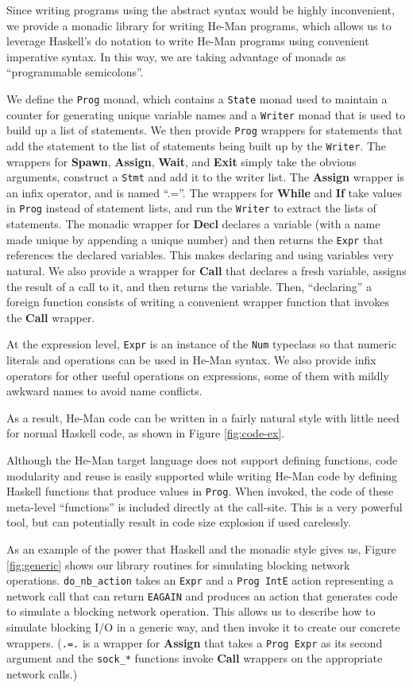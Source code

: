 \documentclass[preprint]{sigplanconf}
\renewcommand{\t}{\texttt}
\renewcommand{\b}{\textbf}
\begin{document}
Since writing programs using the abstract syntax would be highly
inconvenient, we provide a monadic library for writing He-Man
programs, which allows us to leverage Haskell's do notation to write
He-Man programs using convenient imperative syntax. In this way, we
are taking advantage of monads as ``programmable semicolons''.

We define the \t{Prog} monad, which contains a \t{State} monad used to
maintain a counter for generating unique variable names and a
\t{Writer} monad that is used to build up a list of statements. We
then provide \t{Prog} wrappers for statements that add the statement
to the list of statements being built up by the \t{Writer}. The
wrappers for \b{Spawn}, \b{Assign}, \b{Wait}, and \b{Exit} simply take
the obvious arguments, construct a \t{Stmt} and add it to the writer
list. The \b{Assign} wrapper is an infix operator, and is named
``.=''. The wrappers for \b{While} and \b{If} take values in \t{Prog}
instead of statement lists, and run the \t{Writer} to extract the
lists of statements. The monadic wrapper for \b{Decl} declares a
variable (with a name made unique by appending a unique number) and
then returns the \t{Expr} that references the declared variables. This
makes declaring and using variables very natural. We also provide a
wrapper for \b{Call} that declares a fresh variable, assigns the
result of a call to it, and then returns the variable. Then,
``declaring'' a foreign function consists of writing a convenient
wrapper function that invokes the \b{Call} wrapper.

At the expression level, \t{Expr} is an instance of the \t{Num} typeclass 
so that numeric literals and operations can be used in He-Man
syntax. We also provide infix operators for other useful operations on
expressions, some of them with mildly awkward names to avoid name conflicts.

As a result, He-Man code can be written in a fairly natural style with little
need for normal Haskell code, as shown in Figure \ref{fig:code-ex}.

Although the He-Man target language does not support defining
functions, code modularity and reuse is easily supported while writing
He-Man code by defining Haskell functions that produce values in
\t{Prog}. When invoked, the code of these meta-level ``functions'' is
included directly at the call-site. This is a very powerful tool, but
can potentially result in code size explosion if used carelessly.

As an example of the power that Haskell and the monadic style gives
us, Figure \ref{fig:generic} shows our library routines for simulating
blocking network operations. \t{do\_nb\_action} takes an
\t{Expr} and a \t{Prog IntE} action representing a network call that
can return \t{EAGAIN} and produces an action that generates code to
simulate a blocking network operation. This allows us to describe how
to simulate blocking I/O in a generic way, and then invoke it to
create our concrete wrappers. (\t{.=.} is a wrapper for \b{Assign} 
that takes a \t{Prog Expr} as its second argument and the \t{sock\_*} 
functions invoke \b{Call} wrappers on the appropriate network calls.)
\end{document}
